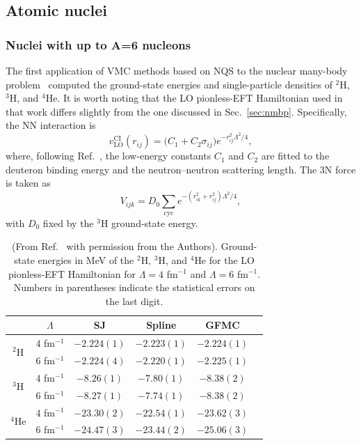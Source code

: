 \subsection{Atomic nuclei}
\label{sub:nuclei}

\subsubsection[Nuclei with up to A=6 nucleons]{Nuclei with up to A=6 nucleons}
The first application of VMC methods based on NQS to the nuclear many-body problem~\cite{adams_variational_2021} computed the ground-state energies and single-particle densities of $^2$H, $^3$H, and $^4$He. It is worth noting that the LO pionless-EFT Hamiltonian used in that work differs slightly from the one discussed in Sec.~\ref{sec:nmbp}. Specifically, the NN interaction is
\begin{equation}
v_{\mathrm{LO}}^{\mathrm{CI}}(r_{ij}) = \bigl(C_1 + C_2 \sigma_{ij}\bigr)
e^{-r_{ij}^2 \Lambda^2 / 4},
\label{eq:v_nn_contessi}
\end{equation}
where, following Ref.~\cite{kirscher_spectra_2015}, the low-energy constants $C_1$ and $C_2$ are fitted to the deuteron binding energy and the neutron–neutron scattering length. The 3N force is taken as
\begin{equation}
V_{ijk} = D_0 \sum_{\mathrm{cyc}}
e^{-(r_{ik}^2 + r_{ij}^2)\Lambda^2/4},
\end{equation}
with $D_0$ fixed by the $^3$H ground-state energy.

\begin{table}[!b]
\begin{center}
\begin{tabular}{ c | c | c c c c }
\hline
\hline
& $\Lambda$ & SJ  &  Spline & GFMC\\
\hline
\multirow{2}{*}{$^2$H } & $4$ fm$^{-1}$ & $-2.224(1)$  &   $-2.223(1)$  & $-2.224(1)$ \\
& $6$ fm$^{-1}$ & $-2.224(4)$  &   $-2.220(1)$  & $-2.225(1)$ \\
\hline
\multirow{2}{*}{$^3$H } & $4$ fm$^{-1}$ & $-8.26(1)$  &   $-7.80(1)$  & $-8.38(2)$ \\
& $6$ fm$^{-1}$ & $-8.27(1)$  &   $-7.74(1)$  & $-8.38(2)$ \\
\hline
\multirow{2}{*}{$^4$He } & $4$ fm$^{-1}$ & $-23.30(2)$  &   $-22.54(1)$  & $-23.62(3)$ \\
& $6$ fm$^{-1}$ & $-24.47(3)$  &   $-23.44(2)$  & $-25.06(3)$ \\
\hline
\end{tabular}
\caption{(From Ref.~\cite{adams_variational_2021} with permission from the Authors). Ground-state energies in MeV of the $^2$H, $^3$H, and $^4$He for the LO pionless-EFT Hamiltonian for $\Lambda = 4$ fm$^{-1}$ and $\Lambda = 6$ fm$^{-1}$. Numbers in parentheses indicate the statistical errors on the last digit.}
\label{tab:2h}
\end{center}
\end{table}

